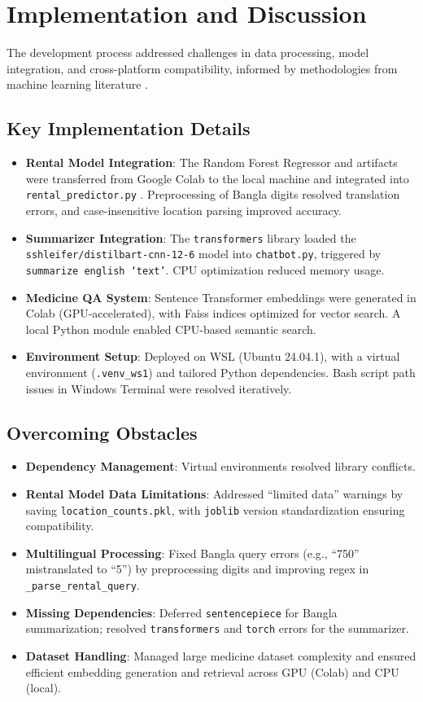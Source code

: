 \documentclass[a4paper,10pt,conference]{IEEEtran}
\begin{document}
\section{Implementation and Discussion}
The development process addressed challenges in data processing, model integration, and cross-platform compatibility, informed by methodologies from machine learning literature \cite{b1}.

\subsection{Key Implementation Details}
\begin{itemize}
    \item \textbf{Rental Model Integration}: The Random Forest Regressor and artifacts were transferred from Google Colab to the local machine and integrated into \texttt{rental\_predictor.py} \cite{b1}. Preprocessing of Bangla digits resolved translation errors, and case-insensitive location parsing improved accuracy.
    \item \textbf{Summarizer Integration}: The \texttt{transformers} library loaded the \texttt{sshleifer/distilbart-cnn-12-6} model into \texttt{chatbot.py}, triggered by \texttt{summarize english `text'}. CPU optimization reduced memory usage.
    \item \textbf{Medicine QA System}: Sentence Transformer embeddings were generated in Colab (GPU-accelerated), with Faiss indices optimized for vector search. A local Python module enabled CPU-based semantic search.
    \item \textbf{Environment Setup}: Deployed on WSL (Ubuntu 24.04.1), with a virtual environment (\texttt{.venv\_ws1}) and tailored Python dependencies. Bash script path issues in Windows Terminal were resolved iteratively.
\end{itemize}

\subsection{Overcoming Obstacles}
\begin{itemize}
    \item \textbf{Dependency Management}: Virtual environments resolved library conflicts.
    \item \textbf{Rental Model Data Limitations}: Addressed ``limited data'' warnings by saving \texttt{location\_counts.pkl}, with \texttt{joblib} version standardization ensuring compatibility.
    \item \textbf{Multilingual Processing}: Fixed Bangla query errors (e.g., ``750'' mistranslated to ``5'') by preprocessing digits and improving regex in \texttt{\_parse\_rental\_query}.
    \item \textbf{Missing Dependencies}: Deferred \texttt{sentencepiece} for Bangla summarization; resolved \texttt{transformers} and \texttt{torch} errors for the summarizer.
    \item \textbf{Dataset Handling}: Managed large medicine dataset complexity and ensured efficient embedding generation and retrieval across GPU (Colab) and CPU (local).
\end{itemize}
\end{document}
